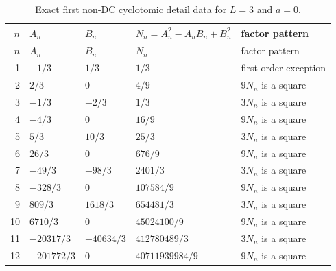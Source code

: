 \begin{longtable}{rllll}
\caption{Exact first non-DC cyclotomic detail data for $L=3$ and $a=0$.}\label{tab:cyclotomic-norms}\\
\toprule
$n$ & $A_n$ & $B_n$ & $N_n=A_n^2-A_nB_n+B_n^2$ & factor pattern\\
\midrule
\endfirsthead
\toprule
$n$ & $A_n$ & $B_n$ & $N_n$ & factor pattern\\
\midrule
\endhead
1 & $-1/3$ & $1/3$ & $1/3$ & first-order exception\\
2 & $2/3$ & $0$ & $4/9$ & $9N_n$ is a square\\
3 & $-1/3$ & $-2/3$ & $1/3$ & $3N_n$ is a square\\
4 & $-4/3$ & $0$ & $16/9$ & $9N_n$ is a square\\
5 & $5/3$ & $10/3$ & $25/3$ & $3N_n$ is a square\\
6 & $26/3$ & $0$ & $676/9$ & $9N_n$ is a square\\
7 & $-49/3$ & $-98/3$ & $2401/3$ & $3N_n$ is a square\\
8 & $-328/3$ & $0$ & $107584/9$ & $9N_n$ is a square\\
9 & $809/3$ & $1618/3$ & $654481/3$ & $3N_n$ is a square\\
10 & $6710/3$ & $0$ & $45024100/9$ & $9N_n$ is a square\\
11 & $-20317/3$ & $-40634/3$ & $412780489/3$ & $3N_n$ is a square\\
12 & $-201772/3$ & $0$ & $40711939984/9$ & $9N_n$ is a square\\
\bottomrule
\end{longtable}
